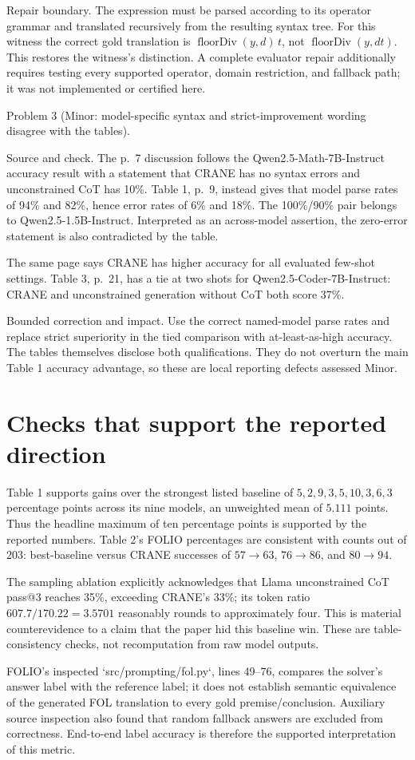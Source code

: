 \documentclass[10pt]{article}
\begin{document}
Repair boundary. The expression must be parsed according to its operator grammar and translated recursively from the resulting syntax tree. For this witness the correct gold translation is \(\operatorname{floorDiv}(y,d)\,t\), not \(\operatorname{floorDiv}(y,dt)\). This restores the witness’s distinction. A complete evaluator repair additionally requires testing every supported operator, domain restriction, and fallback path; it was not implemented or certified here.\par
Problem 3 (Minor: model-specific syntax and strict-improvement wording disagree with the tables).\par
Source and check. The p. 7 discussion follows the Qwen2.5-Math-7B-Instruct accuracy result with a statement that CRANE has no syntax errors and unconstrained CoT has 10\%. Table 1, p. 9, instead gives that model parse rates of 94\% and 82\%, hence error rates of 6\% and 18\%. The 100\%/90\% pair belongs to Qwen2.5-1.5B-Instruct. Interpreted as an across-model assertion, the zero-error statement is also contradicted by the table.\par
The same page says CRANE has higher accuracy for all evaluated few-shot settings. Table 3, p. 21, has a tie at two shots for Qwen2.5-Coder-7B-Instruct: CRANE and unconstrained generation without CoT both score 37\%.\par
Bounded correction and impact. Use the correct named-model parse rates and replace strict superiority in the tied comparison with at-least-as-high accuracy. The tables themselves disclose both qualifications. They do not overturn the main Table 1 accuracy advantage, so these are local reporting defects assessed Minor.\par
\section*{Checks that support the reported direction}
Table 1 supports gains over the strongest listed baseline of \(5,2,9,3,5,10,3,6,3\) percentage points across its nine models, an unweighted mean of \(5.111\) points. Thus the headline maximum of ten percentage points is supported by the reported numbers. Table 2’s FOLIO percentages are consistent with counts out of 203: best-baseline versus CRANE successes of \(57\to63\), \(76\to86\), and \(80\to94\).\par
The sampling ablation explicitly acknowledges that Llama unconstrained CoT pass@3 reaches 35\%, exceeding CRANE’s 33\%; its token ratio \(607.7/170.22=3.5701\) reasonably rounds to approximately four. This is material counterevidence to a claim that the paper hid this baseline win. These are table-consistency checks, not recomputation from raw model outputs.\par
FOLIO’s inspected `src/prompting/fol.py`, lines 49–76, compares the solver’s answer label with the reference label; it does not establish semantic equivalence of the generated FOL translation to every gold premise/conclusion. Auxiliary source inspection also found that random fallback answers are excluded from correctness. End-to-end label accuracy is therefore the supported interpretation of this metric.\par
\end{document}
